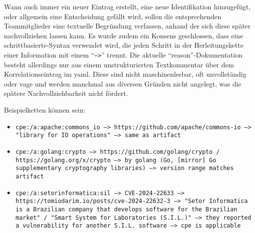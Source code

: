 
Wann auch immer ein neuer Eintrag erstellt, eine neue Identifikation hinzugefügt, oder allgemein eine Entscheidung gefällt wird, sollen die entsprechenden Teammitglieder eine textuelle Begründung verfassen, anhand der sich diese später nachvollziehen lassen kann.
Es wurde zudem ein Konsens geschlossen, dass eine schrittbasierte-Syntax verwendet wird, die jeden Schritt in der Herleitungskette einer Information mit einem \enquote{\texttt{-->}} trennt.
Die aktuelle \enquote{reason}-Dokumentation besteht allerdings nur aus einem unstrukturierten Textkommentar über dem Korrelationseintrag im \acrshort{yaml}.
Diese sind nicht maschinenlesbar, oft unvollständig oder vage und werden manchmal aus diversen Gründen nicht angelegt, was die spätere Nachvollziehbarkeit nicht fördert.

Beispielketten können sein:

\begin{itemize}
    \itemsep0em
    \item \texttt{cpe:/a:apache:commons\_io --> https://github.com/apache/commons-io --> "library for IO operations" --> same as artifact}
    \item \texttt{cpe:/a:golang:crypto --> https://github.com/golang/crypto / https://golang.org/x/crypto --> by golang (Go, [mirror] Go supplementary cryptography libraries) --> version range matches artifact}
    \item \texttt{cpe:/a:setorinformatica:sil --> CVE-2024-22633 --> https://tomiodarim.io/posts/cve-2024-22632-3 --> "Setor Informatica is a Brazilian company that develops software for the Brazilian market" / "Smart System for Laboratories (S.I.L.)" --> they reported a vulnerability for another S.I.L. software --> cpe is applicable}
\end{itemize}

